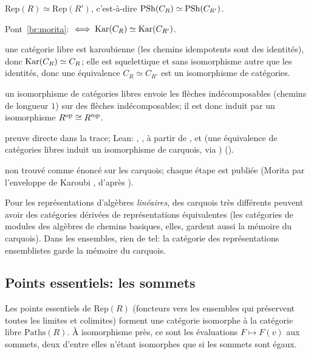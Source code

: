 \begin{trace}
\item[tablier] $\mathrm{Rep}(R)\simeq\mathrm{Rep}(R')$, c'est-à-dire $\mathrm{PSh}(C_R)\simeq\mathrm{PSh}(C_{R'})$.
\item[arche] Pont~\ref{br:morita}: $\iff\operatorname{Kar}(C_R)\simeq\operatorname{Kar}(C_{R'})$.
\item[spécialiser] une catégorie libre est karoubienne (les chemins idempotents sont des identités), donc $\operatorname{Kar}(C_R)\simeq C_R$; elle est squelettique et sans isomorphisme autre que les identités, donc une équivalence $C_R\simeq C_{R'}$ est un isomorphisme de catégories.
\item[réécrire] un isomorphisme de catégories libres envoie les flèches indécomposables (chemins de longueur $1$) sur des flèches indécomposables; il est donc induit par un isomorphisme $R^{\mathrm{op}}\cong R'^{\mathrm{op}}$.
\item[vérifier] preuve directe dans la trace; Lean: , , à partir de ,  et  (une équivalence de catégories libres induit un isomorphisme de carquois, via ) ().
\item[nouveauté] non trouvé comme énoncé sur les carquois; chaque étape est publiée (Morita par l'enveloppe de Karoubi \cite[Lemme~1.1.3]{rogers-thesis}, d'après \cite[A1.1.9--10]{elephant}).
\end{trace}

\inwords{} Pour les représentations d'algèbres \emph{linéaires}, des carquois très différents peuvent avoir des catégories dérivées de représentations équivalentes (les catégories de modules des algèbres de chemins basiques, elles, gardent aussi la mémoire du carquois). Dans les ensembles, rien de tel: la catégorie des représentations ensemblistes garde la mémoire du carquois.

\subsection{Points essentiels: les sommets}

\begin{theorem}\label{th:quiverpoints}
Les points essentiels de $\mathrm{Rep}(R)$ (foncteurs vers les ensembles qui préservent toutes les limites et colimites) forment une catégorie isomorphe à la catégorie libre $\mathrm{Paths}(R)$. À isomorphisme près, ce sont les évaluations $F\mapsto F(v)$ aux sommets, deux d'entre elles n'étant isomorphes que si les sommets sont égaux.
\end{theorem}

